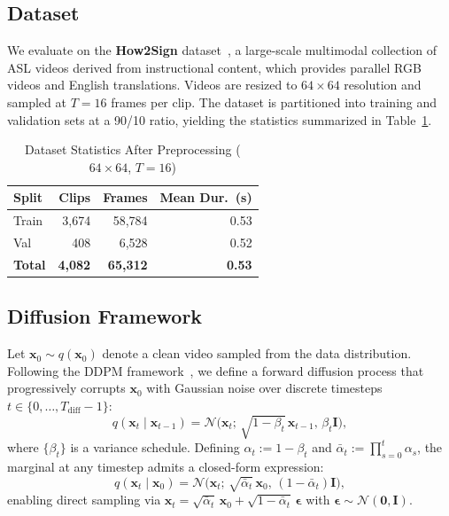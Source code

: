 \documentclass{ieeeaccess}
\begin{document}
\subsection{Dataset}
\label{subsec:dataset}

We evaluate on the \textbf{How2Sign} dataset~\cite{duarte2021how2sign}, a large-scale multimodal collection of ASL videos derived from instructional content, which provides parallel RGB videos and English translations. Videos are resized to $64 \times 64$ resolution and sampled at $T = 16$ frames per clip. The dataset is partitioned into training and validation sets at a 90/10 ratio, yielding the statistics summarized in Table~\ref{tab:dataset_stats}.

\begin{table}[H]
    \centering
    \caption{Dataset Statistics After Preprocessing ($64\times64$, $T=16$)}
    \label{tab:dataset_stats}
    \renewcommand{\arraystretch}{1.15}
    \begin{tabular}{@{} l r r r @{}}
        \toprule
        \rowcolor{tableheader}
        \textbf{Split} & \textbf{Clips} & \textbf{Frames} & \textbf{Mean Dur.\ (s)} \\
        \midrule
        \rowcolor{tablerow1}
        Train  & 3,674 & 58,784 & 0.53 \\
        \rowcolor{tablerow2}
        Val    & 408   & 6,528  & 0.52 \\
        \midrule
        \rowcolor{tablerow1}
        \textbf{Total}  & \textbf{4,082} & \textbf{65,312} & \textbf{0.53} \\
        \bottomrule
    \end{tabular}
\end{table}

\subsection{Diffusion Framework}
\label{subsec:background_diffusion}

Let $\mathbf{x}_0 \sim q(\mathbf{x}_0)$ denote a clean video sampled from the data distribution. Following the DDPM framework~\cite{ho2020ddpm}, we define a forward diffusion process that progressively corrupts $\mathbf{x}_0$ with Gaussian noise over discrete timesteps $t \in \{0, \ldots, T_\mathrm{diff}-1\}$:
\begin{equation}
    q(\mathbf{x}_t \mid \mathbf{x}_{t-1}) = \mathcal{N}\bigl(\mathbf{x}_t;\, \sqrt{1-\beta_t}\,\mathbf{x}_{t-1},\, \beta_t \mathbf{I}\bigr),
\end{equation}
where $\{\beta_t\}$ is a variance schedule. Defining $\alpha_t := 1 - \beta_t$ and $\bar{\alpha}_t := \prod_{s=0}^{t} \alpha_s$, the marginal at any timestep admits a closed-form expression:
\begin{equation}
    q(\mathbf{x}_t \mid \mathbf{x}_0) = \mathcal{N}\bigl(\mathbf{x}_t;\, \sqrt{\bar{\alpha}_t}\,\mathbf{x}_0,\, (1-\bar{\alpha}_t)\mathbf{I}\bigr),
\end{equation}
enabling direct sampling via $\mathbf{x}_t = \sqrt{\bar{\alpha}_t}\,\mathbf{x}_0 + \sqrt{1-\bar{\alpha}_t}\,\boldsymbol{\epsilon}$ with $\boldsymbol{\epsilon} \sim \mathcal{N}(\mathbf{0}, \mathbf{I})$.
\end{document}
